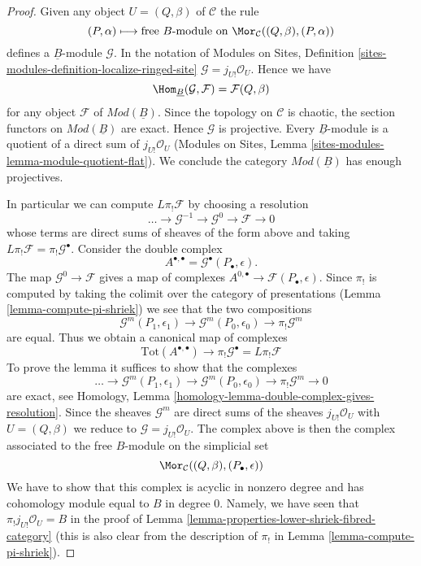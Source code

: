 \begin{proof}
Given any object $U = (Q, \beta)$ of $\mathcal{C}$ the rule
$$
(P, \alpha) \longmapsto
\text{free }B\text{-module on }\Mor_\mathcal{C}((Q, \beta), (P, \alpha))
$$
defines a $\underline{B}$-module $\mathcal{G}$. In the notation of
Modules on Sites, Definition
\ref{sites-modules-definition-localize-ringed-site}
$\mathcal{G} = j_{U!}\mathcal{O}_U$. Hence we have
$$
\Hom_{\underline{B}}(\mathcal{G}, \mathcal{F}) = \mathcal{F}(Q, \beta)
$$
for any object $\mathcal{F}$ of $\textit{Mod}(\underline{B})$.
Since the topology on $\mathcal{C}$ is chaotic, the section functors on
$\textit{Mod}(\underline{B})$ are exact. Hence $\mathcal{G}$
is projective. Every $\underline{B}$-module is a quotient of a
direct sum of $j_{U!}\mathcal{O}_U$
(Modules on Sites, Lemma \ref{sites-modules-lemma-module-quotient-flat}).
We conclude the category
$\textit{Mod}(\underline{B})$ has enough projectives.

\medskip\noindent
In particular we can compute $L\pi_!\mathcal{F}$ by choosing a resolution
$$
\ldots \to \mathcal{G}^{-1} \to \mathcal{G}^0 \to \mathcal{F} \to 0
$$
whose terms are direct sums of sheaves of the form above and taking
$L\pi_!\mathcal{F} = \pi_!\mathcal{G}^\bullet$. Consider the
double complex
$$
A^{\bullet, \bullet} = \mathcal{G}^\bullet(P_\bullet, \epsilon).
$$
The map $\mathcal{G}^0 \to \mathcal{F}$ gives a map of complexes
$A^{0, \bullet} \to \mathcal{F}(P_\bullet, \epsilon)$.
Since $\pi_!$ is computed by taking the colimit over the category
of presentations (Lemma \ref{lemma-compute-pi-shriek})
we see that the two compositions
$$
\mathcal{G}^m(P_1, \epsilon_1) \to \mathcal{G}^m(P_0, \epsilon_0)
\to \pi_!\mathcal{G}^m
$$
are equal. Thus we obtain a canonical map of complexes
$$
\text{Tot}(A^{\bullet, \bullet})
\longrightarrow
\pi_!\mathcal{G}^\bullet = L\pi_!\mathcal{F}
$$
To prove the lemma it suffices to show that the complexes
$$
\ldots \to \mathcal{G}^m(P_1, \epsilon_1) \to
\mathcal{G}^m(P_0, \epsilon_0) \to \pi_!\mathcal{G}^m \to 0
$$
are exact, see Homology, Lemma
\ref{homology-lemma-double-complex-gives-resolution}.
Since the sheaves $\mathcal{G}^m$ are direct sums of the sheaves
$j_{U!}\mathcal{O}_U$ with $U = (Q, \beta)$ we reduce to
$\mathcal{G} = j_{U!}\mathcal{O}_U$. The complex above is then
the complex associated to the free $B$-module on the simplicial set
$$
\Mor_\mathcal{C}((Q, \beta), (P_\bullet, \epsilon))
$$
We have to show that this complex is acyclic in nonzero degree
and has cohomology module equal to $B$ in degree $0$.
Namely, we have seen that $\pi_!j_{U!}\mathcal{O}_U = B$ in the proof of
Lemma \ref{lemma-properties-lower-shriek-fibred-category}
(this is also clear from the description of $\pi_!$
in Lemma \ref{lemma-compute-pi-shriek}).


\end{proof}
